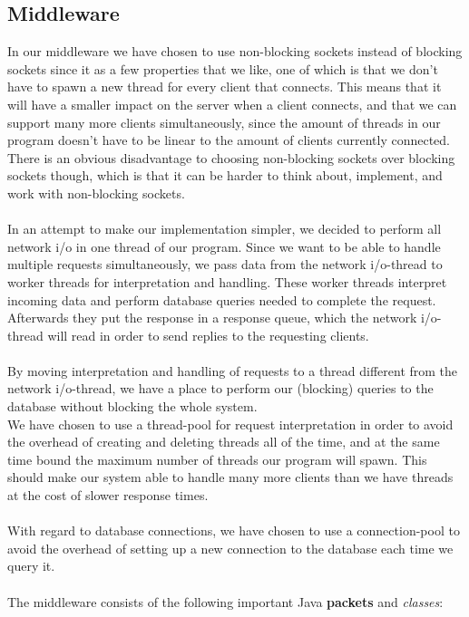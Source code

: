 \documentclass{article}
\begin{document}
        \subsection{Middleware}
            In our middleware we have chosen to use non-blocking sockets instead of blocking sockets since it as a few properties that we like, one of which is that we don't have to spawn a new thread for every client that connects. This means that it will have a smaller impact on the server when a client connects, and that we can support many more clients simultaneously, since the amount of threads in our program doesn't have to be linear to the amount of clients currently connected. There is an obvious disadvantage to choosing non-blocking sockets over blocking sockets though, which is that it can be harder to think about, implement, and work with non-blocking sockets.\\
            \\
            In an attempt to make our implementation simpler, we decided to perform all network i/o in one thread of our program. Since we want to be able to handle multiple requests simultaneously, we pass data from the network i/o-thread to worker threads for interpretation and handling. These worker threads interpret incoming data and perform database queries needed to complete the request. Afterwards they put the response in a response queue, which the network i/o-thread will read in order to send replies to the requesting clients.\\
            \\
            By moving interpretation and handling of requests to a thread different from the network i/o-thread, we have a place to perform our (blocking) queries to the database without blocking the whole system.\\
            We have chosen to use a thread-pool for request interpretation in order to avoid the overhead of creating and deleting threads all of the time, and at the same time bound the maximum number of threads our program will spawn. This should make our system able to handle many more clients than we have threads at the cost of slower response times.\\
            \\
            With regard to database connections, we have chosen to use a connection-pool to avoid the overhead of setting up a new connection to the database each time we query it.\\
            \\
            The middleware consists of the following important Java \textbf{packets} and \textit{classes}:
\end{document}
